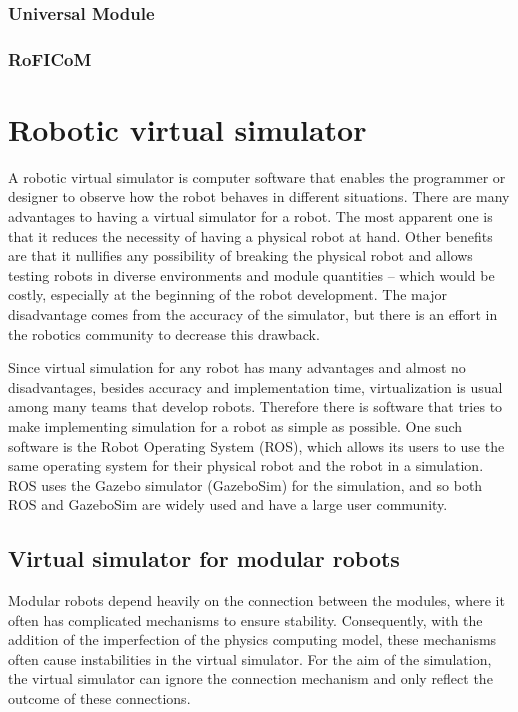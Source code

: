 \documentclass[
  digital, %
  table,   %
  oneside, %
  nolof,     %
  nolot,     %
]{fithesis3}
\begin{document}
\subsection{Universal Module}

\subsection{RoFICoM}


\chapter{Robotic virtual simulator}

A robotic virtual simulator is computer software that enables the programmer or designer to observe how the robot behaves in different situations.
There are many advantages to having a virtual simulator for a robot.
The most apparent one is that it reduces the necessity of having a physical robot at hand.
Other benefits are that it nullifies any possibility of breaking the physical robot and allows testing robots in diverse environments and module quantities -- which would be costly, especially at the beginning of the robot development.
The major disadvantage comes from the accuracy of the simulator, but there is an effort in the robotics community to decrease this drawback.

Since virtual simulation for any robot has many advantages and almost no disadvantages, besides accuracy and implementation time, virtualization is usual among many teams that develop robots.
Therefore there is software that tries to make implementing simulation for a robot as simple as possible.
One such software is the Robot Operating System (ROS), which allows its users to use the same operating system for their physical robot and the robot in a simulation.
ROS uses the Gazebo simulator (GazeboSim) for the simulation, and so both ROS and GazeboSim are widely used and have a large user community.

\section{Virtual simulator for modular robots}

Modular robots depend heavily on the connection between the modules, where it often has complicated mechanisms to ensure stability.
Consequently, with the addition of the imperfection of the physics computing model, these mechanisms often cause instabilities in the virtual simulator.
For the aim of the simulation, the virtual simulator can ignore the connection mechanism and only reflect the outcome of these connections.
\end{document}
